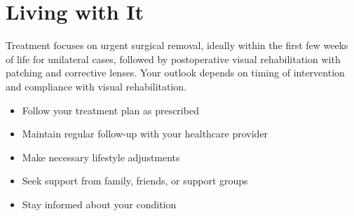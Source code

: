 \section{Living with It}
Treatment focuses on urgent surgical removal, ideally within the first few weeks of life for unilateral cases, followed by postoperative visual rehabilitation with patching and corrective lenses. Your outlook depends on timing of intervention and compliance with visual rehabilitation.

\begin{itemize}[noitemsep]
  \item Follow your treatment plan as prescribed
  \item Maintain regular follow-up with your healthcare provider
  \item Make necessary lifestyle adjustments
  \item Seek support from family, friends, or support groups
  \item Stay informed about your condition
\end{itemize}
